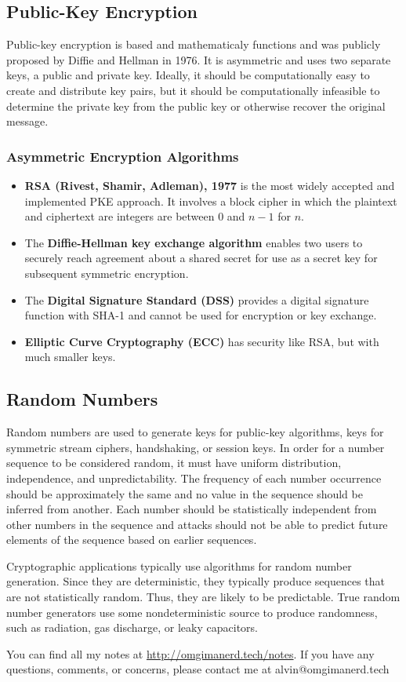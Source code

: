 \documentclass{math}
\begin{document}
\subsection*{Public-Key Encryption}
Public-key encryption is based and mathematicaly functions and was publicly
proposed by Diffie and Hellman in 1976. It is asymmetric and uses two separate
keys, a public and private key. Ideally, it should be computationally easy to
create and distribute key pairs, but it should be computationally infeasible
to determine the private key from the public key or otherwise recover the
original message.

\subsubsection*{Asymmetric Encryption Algorithms}
\begin{itemize}
  \item \textbf{RSA (Rivest, Shamir, Adleman), 1977} is the most widely
  accepted and implemented PKE approach. It involves a block cipher in which
  the plaintext and ciphertext are integers are between 0 and \( n-1 \) for
  \( n \).
  \item The \textbf{Diffie-Hellman key exchange algorithm} enables two users to
  securely reach agreement about a shared secret for use as a secret key for
  subsequent symmetric encryption.
  \item The \textbf{Digital Signature Standard (DSS)} provides a digital
  signature function with SHA-1 and cannot be used for encryption or key
  exchange.
  \item \textbf{Elliptic Curve Cryptography (ECC)} has security like RSA, but
  with much smaller keys.
\end{itemize}

\subsection*{Random Numbers}
Random numbers are used to generate keys for public-key algorithms, keys for
symmetric stream ciphers, handshaking, or session keys. In order for a number
sequence to be considered random, it must have uniform distribution,
independence, and unpredictability. The frequency of each number occurrence
should be approximately the same and no value in the sequence should be
inferred from another. Each number should be statistically independent from
other numbers in the sequence and attacks should not be able to predict future
elements of the sequence based on earlier sequences.
\par Cryptographic applications typically use algorithms for random number
generation. Since they are deterministic, they typically produce sequences
that are not statistically random. Thus, they are likely to be predictable.
True random number generators use some nondeterministic source to produce
randomness, such as radiation, gas discharge, or leaky capacitors.

\begin{center}
  You can find all my notes at \url{http://omgimanerd.tech/notes}. If you have
  any questions, comments, or concerns, please contact me at
  alvin@omgimanerd.tech
\end{center}
\end{document}
